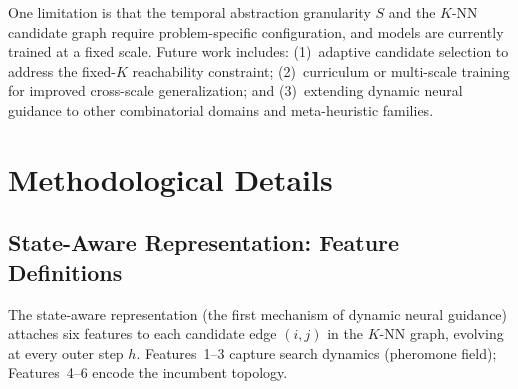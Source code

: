 \documentclass[sigconf,review]{acmart}
\begin{document}
One limitation is that the temporal abstraction granularity $S$ and the $K$-NN candidate graph require problem-specific configuration, and models are currently trained at a fixed scale.
Future work includes: (1)~adaptive candidate selection to address the fixed-$K$ reachability constraint; (2)~curriculum or multi-scale training for improved cross-scale generalization; and (3)~extending dynamic neural guidance to other combinatorial domains and meta-heuristic families.


\newpage



\newpage
\appendix

\setcounter{table}{0}
\renewcommand{\thetable}{A\arabic{table}}
\setcounter{figure}{0}
\renewcommand{\thefigure}{A\arabic{figure}}
\setcounter{algorithm}{0}
\renewcommand{\thealgorithm}{A\arabic{algorithm}}

\section{Methodological Details}
\label{app:method}

\subsection{State-Aware Representation: Feature Definitions}
\label{app:state-features}

The state-aware representation (the first mechanism of dynamic neural guidance) attaches six features to each candidate edge $(i,j)$ in the $K$-NN graph, evolving at every outer step $h$.
Features~1--3 capture search dynamics (pheromone field); Features~4--6 encode the incumbent topology.
\end{document}
